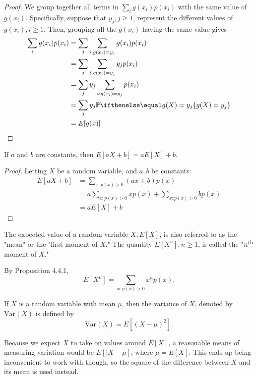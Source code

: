 \documentclass[a4paper,8pt]{article}
\begin{document}
\begin{outline}
    \begin{proof}
      We group together all terms in \(\sum_i g(x_i)p(x_i)\) with the same value of \(g(x_i)\). Specifically,
      suppose that \(y_j, j\geq 1\), represent the different values of \(g(x_i), i\geq 1\). Then, grouping
      all the \(g(x_i)\) having the same value gives
      \begin{align*}
        \sum_ig(x_i)p(x_i) &= \sum_j\sum_{i: g(x_i)=y_j} g(x_i)p(x_i) \\
                           &= \sum_j\sum_{i:g(x_i)=y_j} y_jp(x_i) \\
                           &= \sum_jy_j\sum_{i:g(x_i)=y_j}p(x_i) \\
                           &= \sum_jy_j\bbp[g(X)=y_j]\\
                           &= E[g(x)]
      \end{align*}
    \end{proof}

    If \(a\) and \(b\) are constants, then \(E[aX + b] = aE[X] + b\).

    \begin{proof}
      Letting \(X\) be a random variable, and \(a, b\) be constants:
      \begin{align*}
        E[aX + b] &= \sum_{x:p(x)>0}(ax + b)p(x) \\
                  &= a\sum_{x:p(x)>0}xp(x) + \sum_{x:p(x)>0}bp(x) \\
                  &= aE[X] + b
      \end{align*}
    \end{proof}

    The expected value of a random variable \(X, E[X]\), is also referred to as the "mean" or the "first moment
    of \(X\)." The quantity \(E[X^n], n\geq 1\), is called the "\(n\textsuperscript{th}\) moment of \(X\)."

    By Proposition 4.4.1, \[E[X^n] = \sum_{x:p(x)>0}x^np(x)\text{.}\]

    If \(X\) is a random variable with mean \(\mu\), then the variance of \(X\), denoted by \(\text{Var}(X)\)
    is defined by \[\text{Var}(X) = E[(X-\mu)^2]\text{.} \]

    \begin{justification}
      Because we expect \(X\) to take on values around \(E[X]\), a reasonable means of measuring variation would be
      \(E[|X-\mu]\), where \(\mu = E[X]\). This ends up being inconvenient to work with though, so the square of the
      difference between \(X\) and its mean is used instead.
    \end{justification}


\end{outline}
\end{document}
